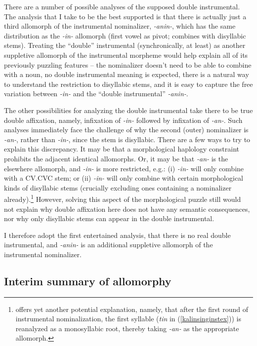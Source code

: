 \documentclass[output=paper]{langscibook}
\begin{document}
There are a number of possible analyses of the supposed double instrumental. The analysis that I take to be the best supported is that there is actually just a third allomorph of the instrumental nominalizer, \textit{-anin-}, which has the same distribution as the \textit{-in-} allomorph (first vowel as pivot; combines with disyllabic stems). Treating the ``double'' instrumental (synchronically, at least) as another suppletive allomorph of the instrumental morpheme would help explain all of its previously puzzling features -- the nominalizer doesn't need to be able to combine with a noun, no double instrumental meaning is expected, there is a natural way to understand the restriction to disyllabic stems, and it is easy to capture the free variation between \textit{-in-} and the ``double instrumental'' \textit{-anin-}.

The other possibilities for analyzing the double instrumental take there to be true double affixation, namely, infixation of \textit{-in-} followed by infixation of \textit{-an-}. Such analyses immediately face the challenge of why the second (outer)  nominalizer is \textit{-an-}, rather than \textit{-in-}, since the stem is disyllabic. There are a few ways to try to explain this discrepancy. It may be that a morphological haplology constraint prohibits the adjacent identical allomorphs. Or, it may be that \textit{-an-} is the elsewhere allomorph, and \textit{-in-} is more restricted, e.g.: (i) \textit{-in-} will only combine with a CV.CVC stem; or (ii) \textit{-in-} will only combine with certain morphological kinds of disyllabic stems (crucially excluding ones containing a nominalizer already).\footnote{\citet[64]{Rad81} offers yet another potential explanation, namely, that after the first round of instrumental nominalization, the first syllable (\textit{tin} in (\ref{kalinsinginstex})) is reanalyzed as a monosyllabic root, thereby taking \textit{-an-} as the appropriate allomorph.}  However, solving this aspect of the morphological puzzle still would not explain why double affixation here does not have any semantic consequences, nor why only disyllabic stems can appear in the double instrumental. 

I therefore adopt the first entertained analysis, that there is no real double instrumental, and \textit{-anin-} is an additional suppletive allomorph of the instrumental nominalizer.

\subsection{Interim summary of allomorphy}\label{kalinallosec}\label{sec:kalin:3.3}
\end{document}
